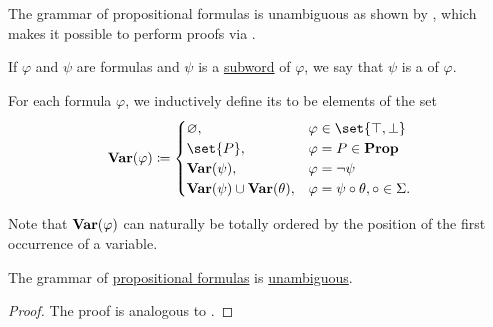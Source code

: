 \begin{definition}
\begin{thmenum}
    The grammar of propositional formulas is unambiguous as shown by , which makes it possible to perform proofs via .

     If \( \varphi \) and \( \psi \) are formulas and \( \psi \) is a \hyperref[def:formal_language/subword]{subword} of \( \varphi \), we say that \( \psi \) is a  of \( \varphi \).

     For each formula \( \varphi \), we inductively define its  to be elements of the set
    \begin{equation}\label{eq:def:propositional_syntax/varables}
      \boldop{Var}(\varphi) \coloneqq \begin{cases}
        \varnothing,                                  &\varphi \in \set{ \top, \bot } \\
        \set{ P },                                    &\varphi = P \in \boldop{Prop} \\
        \boldop{Var}(\psi),                           &\varphi = \neg \psi \\
        \boldop{Var}(\psi) \cup \boldop{Var}(\theta), &\varphi = \psi \bincirc \theta, \bincirc \in \Sigma.
      \end{cases}
    \end{equation}

    Note that \( \operatorname{\mathbf{Var}}(\varphi) \) can naturally be totally ordered by the position of the first occurrence of a variable.
  \end{thmenum}
\end{definition}

\begin{proposition}\label{thm:propositional_formulas_are_unambiguous}
  The grammar of \hyperref[def:propositional_syntax/formula]{propositional formulas} is \hyperref[def:grammar_derivation/unambiguous]{unambiguous}.
\end{proposition}
\begin{proof}
  The proof is analogous to .
\end{proof}

